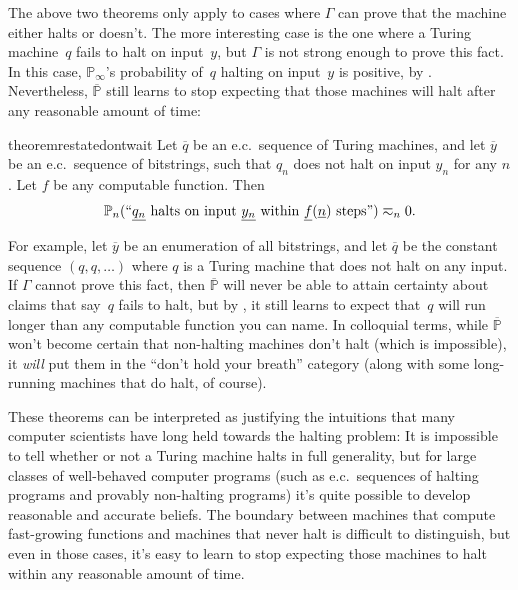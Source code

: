 \documentclass[authordate,onecolumn,noenvironments]{miri-tech-article}
\numberwithin{equation}{subsection}
\newcommand{\quot}[1]{``#1"}
\newcommand{\enc}[1]{{\underline{#1}}}
\newcommand{\seq}[1]{{\overline{#1}}}
\newcommand{\nn}{n}
\newcommand{\ec}[1][\ ]{e.c.#1}
\newcommand{\rparenthetical}[1]{\hfill\upshape{{\small (#1)}}} %
\newcommand{\proofin}[1]{\rparenthetical{Proof in:~#1.}}
\newcommand{\BelState}{\mathbb{P}}
\newcommand{\pt}{\BelState}
\newcommand{\MP}{\seq{\pt}}
\newcommand{\Theory}{\Gamma}
\begin{document}
The above two theorems only apply to cases where $\Theory$ can prove that the machine either halts or doesn't. The more interesting case is the one where a Turing machine~$q$ fails to halt on input~$y$, but $\Theory$ is not strong enough to prove this fact. In this case, $\pt_\infty$'s probability of~$q$ halting on input~$y$ is positive, by . Nevertheless, $\MP$ still learns to stop expecting that those machines will halt after any reasonable amount of time:

\begin{restatable}{theorem}{restatedontwait}\label{thm:dontwait}
  Let $\seq{q}$ be an \ec sequence of Turing machines, and let $\seq{y}$ be an \ec sequence of bitstrings, such that $q_\nn$ does not halt on input $y_\nn$ for any $\nn$. Let $f$ be any computable function. Then
  \[
    \pt_\nn(\quot{\text{$\enc{q_\nn}$ halts on input $\enc{y_\nn}$ within $\enc{f}(\enc{\nn})$ steps}}) \eqsim_\nn 0.
  \]
  \proofin{\ref{app:dontwait}}
\end{restatable}

For example, let $\seq{y}$ be an enumeration of all bitstrings, and let $\seq{q}$ be the constant sequence $(q, q, \ldots)$ where $q$ is a Turing machine that does not halt on any input. If $\Theory$ cannot prove this fact, then $\MP$ will never be able to attain certainty about claims that say~$q$ fails to halt, but by , it still learns to expect that~$q$ will run longer than any computable function you can name. 
In colloquial terms, while $\MP$ won't become certain that non-halting machines don't halt (which is impossible), it \emph{will} put them in the ``don't hold your breath'' category (along with some long-running machines that do halt, of course).

These theorems can be interpreted as justifying the intuitions that many computer scientists have long held towards the halting problem: It is impossible to tell whether or not a Turing machine halts in full generality, but for large classes of well-behaved computer programs (such as \ec sequences of halting programs and provably non-halting programs) it's quite possible to develop reasonable and accurate beliefs. The boundary between machines that compute fast-growing functions and machines that never halt is difficult to distinguish, but even in those cases, it's easy to learn to stop expecting those machines to halt within any reasonable amount of time.  
\end{document}
